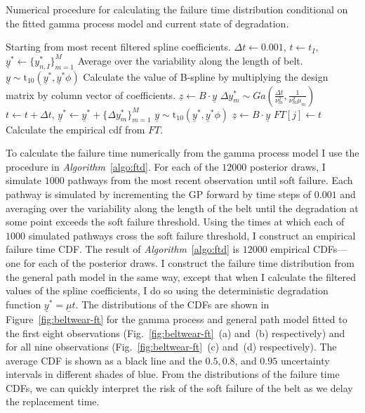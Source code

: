 \begin{algorithm}
	\caption{Numerical procedure for calculating the failure time distribution conditional on the fitted gamma process model and current state of degradation.}
  \label{algo:ftd}
	\begin{algorithmic}[1]
        \State Starting from most recent filtered spline coefficients.
        \State $\Delta t \gets 0.001$, $t \gets t_I$, $\underline{y}^* \gets \{y^*_{n, I}\}^M_{m = 1}$
        \State Average over the variability along the length of belt.
        \State $\underline{y} \sim \mbox{t}_{10}\left(\underline{y}^*, \underline{y}^* \phi\right)$
        \State Calculate the value of B-spline by multiplying the design matrix by column vector of coefficients.
        \State $\underline{z} \gets B \cdot \underline{y}$
          \State $\Delta y^*_m \sim Ga\left(\frac{\Delta t}{\nu_m^2}, \frac{1}{\nu_m^2 \mu_m}\right)$
          \State $t \gets t + \Delta t$, $\underline{y}^* \gets \underline{y}^* + \{\Delta y^*_m\}^M_{m = 1}$
          \State $\underline{y} \sim \mbox{t}_{10}\left(\underline{y}^*, \underline{y}^* \phi\right)$
          \State $\underline{z} \gets B \cdot \underline{y}$
        \EndWhile
        \State $FT[j] \gets t$
      \EndFor
      \State Calculate the empirical cdf from $FT$.
    \EndFor
	\end{algorithmic} 
\end{algorithm} 

To calculate the failure time numerically from the gamma process model I use the procedure in \textit{Algorithm}~\ref{algo:ftd}. For each of the $12000$ posterior draws, I simulate $1000$ pathways from the most recent observation until soft failure. Each pathway is simulated by incrementing the GP forward by time steps of $0.001$ and averaging over the variability along the length of the belt until the degradation at some point exceeds the soft failure threshold. Using the times at which each of $1000$ simulated pathways cross the soft failure threshold, I construct an empirical failure time CDF. The result of \textit{Algorithm}~\ref{algo:ftd} is $12000$ empirical CDFs---one for each of the posterior draws. I construct the failure time distribution from the general path model in the same way, except that when I calculate the filtered values of the spline coefficients, I do so using the deterministic degradation function $\underline{y}^* = \underline{\mu} t$. The distributions of the CDFs are shown in Figure~\ref{fig:beltwear-ft} for the gamma process and general path model fitted to the first eight observations (Fig.~\ref{fig:beltwear-ft}~(a) and~(b) respectively) and for all nine observations (Fig.~\ref{fig:beltwear-ft}~(c) and~(d) respectively). The average CDF is shown as a black line and the $0.5, 0.8$, and $0.95$ uncertainty intervals in different shades of blue. From the distributions of the failure time CDFs, we can quickly interpret the risk of the soft failure of the belt as we delay the replacement time.

